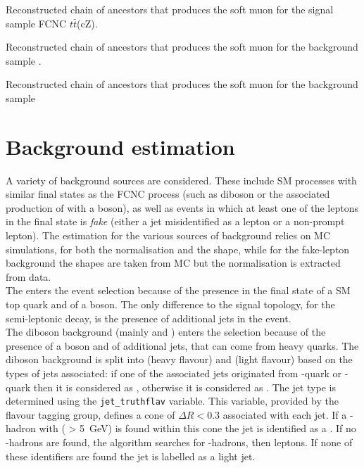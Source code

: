 \begin{table}[!h]
	\centering        
	\footnotesize  
	
	\caption{Reconstructed chain of ancestors that produces the soft muon for the signal sample FCNC $t\bar{t}$(cZ).} %
	\label{tab:sig_comp}
\end{table}    
\begin{table}[!h]
	\centering     
	\footnotesize     
	
	\caption{Reconstructed chain of ancestors that produces the soft muon for the background sample \ttZ.}
	\label{tab:ttZ_comp}
\end{table}    
\begin{table}[!h]
	\centering    
	\footnotesize      
	
	\caption{Reconstructed chain of ancestors that produces the soft muon for the background sample \VVHF }
	\label{tab:VV_comp}
\end{table}    

\section{Background estimation}
\label{sec:background}
A variety of background sources are considered.
These include SM processes with similar final states as the FCNC \tZc
process (such as diboson or the associated production of \ttbar with
a \PZ boson), as well as events in which at least one of the leptons
in the final state is \textit{fake} (either a jet misidentified as a
lepton or a non-prompt lepton).
The estimation for the various sources of background relies on MC
simulations, for both the normalisation and the shape, while for the
\ttbar fake-lepton background the shapes are taken from MC but the
normalisation is extracted from data. \\
The \ttZ enters the event selection because of the presence in the
final state of a SM top quark and of a \PZ boson. The only difference
to the signal topology, for the semi-leptonic \ttbar decay, is the
presence of additional jets in the event. \\
The diboson background (mainly \PW\PZ and \PZ\PZ) enters the selection because of the presence
of a \PZ boson and of additional jets, that can come from heavy
quarks. 
The diboson background is split into \VVHF (heavy flavour) and \VVLF (light flavour) based on the types of jets associated:
if one of the associated jets originated from \Pqb-quark or \Pqc-quark then it is considered as \VVHF, otherwise it is considered as \VVLF. %
The jet type is determined using the \texttt{jet\_truthflav} variable.
This variable, provided by the flavour tagging group, defines a cone of $\Delta R < 0.3$ associated with each jet.
If a \Pqb-hadron with ( \pT > \SI{5}{\GeV}) is found within this cone the jet is identified as a \bjet.
If no \Pqb-hadrons are found, the algorithm searches for \Pqc-hadrons, then \Pgt leptons.
If none of these identifiers are found the jet is labelled as a light jet.\\

